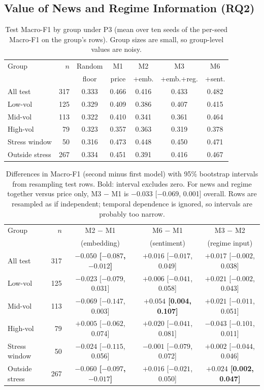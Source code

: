 \subsection{Value of News and Regime Information (RQ2)}\label{sec:regime-results}
\begin{table}[H]
\centering
\small
\begin{tabular}{lrccccc}
\toprule
Group & $n$ & Random & M1 & M2 & M3 & M6\\
 & & floor & price & +emb. & +emb.+reg. & +sent.\\
\midrule
All test & 317 & 0.333 & 0.466 & 0.416 & 0.433 & 0.482\\
Low-vol & 125 & 0.329 & 0.409 & 0.386 & 0.407 & 0.415\\
Mid-vol & 113 & 0.322 & 0.410 & 0.341 & 0.361 & 0.464\\
High-vol & 79 & 0.323 & 0.357 & 0.363 & 0.319 & 0.378\\
Stress window & 50 & 0.316 & 0.473 & 0.448 & 0.450 & 0.471\\
Outside stress & 267 & 0.334 & 0.451 & 0.391 & 0.416 & 0.467\\
\bottomrule
\end{tabular}
\caption[Test Macro-F1 by group under P3]{Test Macro-F1 by group under P3 (mean over ten seeds of the per-seed Macro-F1 on the group's rows). Group sizes are small, so group-level values are noisy.}\label{tab:levels}
\end{table}
\begin{table}[H]
\centering
\small
\begin{tabular}{lrccc}
\toprule
Group & $n$ & M2 $-$ M1 & M6 $-$ M1 & M3 $-$ M2\\
 & & (embedding) & (sentiment) & (regime input)\\
\midrule
All test & 317 & \textbf{$-0.050$ [$-0.087$, $-0.012$]} & $+0.016$ [$-0.017$, 0.049] & $+0.017$ [$-0.002$, 0.038]\\
Low-vol & 125 & $-0.023$ [$-0.079$, 0.031] & $+0.006$ [$-0.041$, 0.058] & $+0.021$ [$-0.002$, 0.043]\\
Mid-vol & 113 & $-0.069$ [$-0.147$, 0.003] & \textbf{$+0.054$ [0.004, 0.107]} & $+0.021$ [$-0.011$, 0.051]\\
High-vol & 79 & $+0.005$ [$-0.062$, 0.074] & $+0.020$ [$-0.041$, 0.081] & $-0.043$ [$-0.101$, 0.011]\\
Stress window & 50 & $-0.024$ [$-0.115$, 0.056] & $-0.001$ [$-0.079$, 0.072] & $+0.002$ [$-0.044$, 0.046]\\
Outside stress & 267 & \textbf{$-0.060$ [$-0.097$, $-0.017$]} & $+0.016$ [$-0.021$, 0.050] & \textbf{$+0.024$ [0.002, 0.047]}\\
\bottomrule
\end{tabular}
\caption[Differences in Macro-F1 between models, by group, with 95\% intervals]{Differences in Macro-F1 (second minus first model) with 95\% bootstrap intervals from resampling test rows. Bold: interval excludes zero. For news and regime together versus price only, M3 $-$ M1 is $-0.033$ [$-0.069$, 0.001] overall. Rows are resampled as if independent; temporal dependence is ignored, so intervals are probably too narrow.}\label{tab:diffs}
\end{table}

